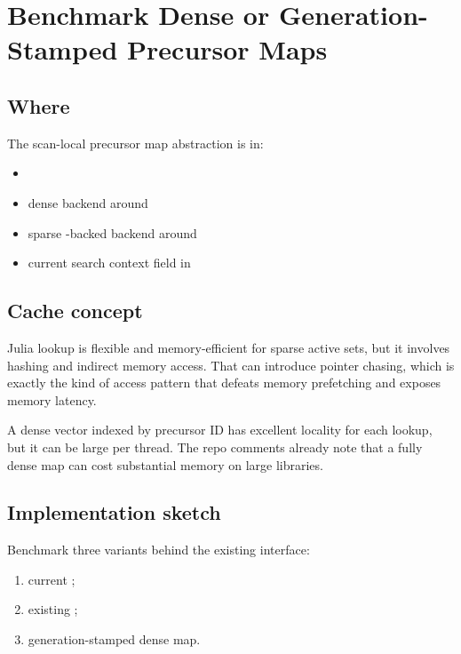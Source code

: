 \documentclass[11pt]{article}
\begin{document}
\section{Benchmark Dense or Generation-Stamped Precursor Maps}

\subsection*{Where}

The scan-local precursor map abstraction is in:

\begin{itemize}
  \item {}
  \item dense backend around 
  \item sparse -backed backend around 
  \item current search context field 
        in 
\end{itemize}

\subsection*{Cache concept}

Julia  lookup is flexible and memory-efficient for sparse active
sets, but it involves hashing and indirect memory access. That can introduce
pointer chasing, which is exactly the kind of access pattern that defeats memory
prefetching and exposes memory latency.

A dense vector indexed by precursor ID has excellent locality for each lookup,
but it can be large per thread. The repo comments already note that a fully
dense map can cost substantial memory on large libraries.

\subsection*{Implementation sketch}

Benchmark three variants behind the existing 
interface:

\begin{enumerate}
  \item current ;
  \item existing ;
  \item generation-stamped dense map.
\end{enumerate}
\end{document}
